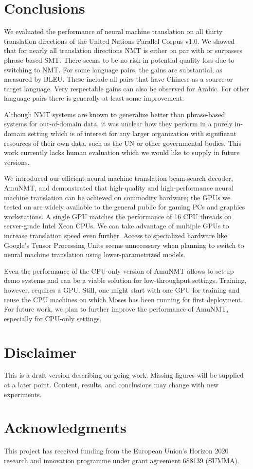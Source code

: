 \documentclass[11pt]{article}
\begin{document}
\section{Conclusions}

We evaluated the performance of neural machine translation on all thirty translation directions of the United Nations Parallel Corpus v1.0. We showed that for nearly all translation directions NMT is either on par with or surpasses phrase-based SMT. There seems to be no risk in potential quality loss due to switching to NMT. For some language pairs, the gains are substantial, as measured by BLEU. These include all pairs that have Chinese as a source or target language. Very respectable gains can also be observed for Arabic. For other language pairs there is generally at least some improvement. 

Although NMT systems are known to generalize better than phrase-based systems for out-of-domain data, it was unclear how they perform in a purely in-domain setting which is of interest for any larger organization with significant resources of their own data, such as the UN or other governmental bodies. This work currently lacks human evaluation which we would like to supply in future versions. 

We introduced our efficient neural machine translation beam-search decoder, AmuNMT, and demonstrated that high-quality and high-performance neural machine translation can be achieved on commodity hardware; the GPUs we tested on are widely available to the general public for gaming PCs and graphics workstations. A single GPU matches the performance of 16 CPU threads on server-grade Intel Xeon CPUs. We can take advantage of multiple GPUs to increase translation speed even further. Access to specialized hardware like Google's Tensor Processing Units seems unnecessary when planning to switch to neural machine translation using lower-parametrized models. 

Even the performance of the CPU-only version of AmuNMT allows to set-up demo systems and can be a viable solution for low-throughput settings. Training, however, requires a GPU. Still, one might start with one GPU for training and reuse the CPU machines on which Moses has been running  for first deployment. For future work, we plan to further improve the performance of AmuNMT, especially for CPU-only settings.

\section*{Disclaimer}
This is a draft version describing on-going work. Missing figures will be supplied at a later point. Content, results, and conclusions may change with new experiments. 

\section*{Acknowledgments}

This project has received funding from the European Union's Horizon 2020 research and innovation
programme under grant agreement 688139 (SUMMA).




\end{document}
